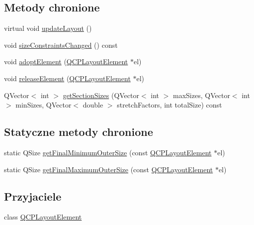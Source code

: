 \subsection*{Metody chronione}
\begin{DoxyCompactItemize}
\item 
virtual void \hyperlink{class_q_c_p_layout_a165c77f6287ac92e8d03017ad913378b}{update\+Layout} ()
\item 
void \hyperlink{class_q_c_p_layout_a6218cd7e5c0e30077c1aeaffe55b6145}{size\+Constraints\+Changed} () const 
\item 
void \hyperlink{class_q_c_p_layout_af6dbbc24156a808da29cd1ec031729a3}{adopt\+Element} (\hyperlink{class_q_c_p_layout_element}{Q\+C\+P\+Layout\+Element} $\ast$el)
\item 
void \hyperlink{class_q_c_p_layout_a4afbb4bef0071f72f91afdac4433a18e}{release\+Element} (\hyperlink{class_q_c_p_layout_element}{Q\+C\+P\+Layout\+Element} $\ast$el)
\item 
Q\+Vector$<$ int $>$ \hyperlink{class_q_c_p_layout_a92d9dcd95e9510b323706ef7fc4ff62e}{get\+Section\+Sizes} (Q\+Vector$<$ int $>$ max\+Sizes, Q\+Vector$<$ int $>$ min\+Sizes, Q\+Vector$<$ double $>$ stretch\+Factors, int total\+Size) const 
\end{DoxyCompactItemize}
\subsection*{Statyczne metody chronione}
\begin{DoxyCompactItemize}
\item 
static Q\+Size \hyperlink{class_q_c_p_layout_a864fddc84721f186663faf3683f1fa70}{get\+Final\+Minimum\+Outer\+Size} (const \hyperlink{class_q_c_p_layout_element}{Q\+C\+P\+Layout\+Element} $\ast$el)
\item 
static Q\+Size \hyperlink{class_q_c_p_layout_add49fd6843821a6126914b837ed52e22}{get\+Final\+Maximum\+Outer\+Size} (const \hyperlink{class_q_c_p_layout_element}{Q\+C\+P\+Layout\+Element} $\ast$el)
\end{DoxyCompactItemize}
\subsection*{Przyjaciele}
\begin{DoxyCompactItemize}
\item 
class \hyperlink{class_q_c_p_layout_a0790750c7e7f14fdbd960d172655b42b}{Q\+C\+P\+Layout\+Element}
\end{DoxyCompactItemize}
